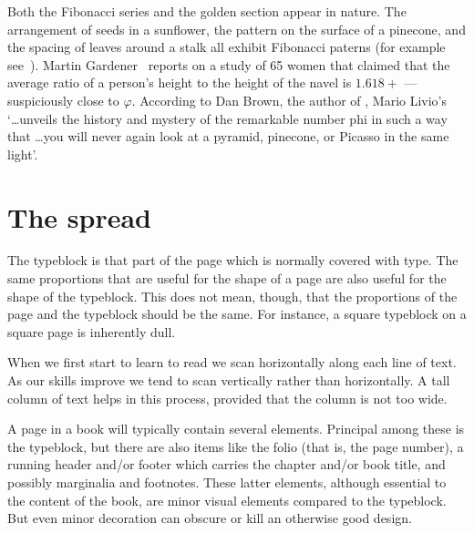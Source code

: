 \documentclass[10pt,letterpaper,extrafontsizes]{memoir}
\begin{document}
    Both the Fibonacci series and the golden section appear in nature.
The arrangement of seeds in a sunflower, the pattern on the surface of a 
pinecone, and the spacing of leaves around a stalk all exhibit Fibonacci
paterns (for example see~\autocite{CONWAY96}). Martin Gardener~\autocite{GARDNER66}
reports on a study of 65 women that claimed that the average ratio of a 
person's height to the height of the navel is $1.618+$ --- suspiciously 
close to $\varphi$. According to Dan Brown, the author of 
, Mario Livio's 
~\autocite{LIVIO02} 
`\ldots unveils the history and mystery of the remarkable
number phi in such a way that \ldots you will never again look at a pyramid,
pinecone, or Picasso in the same light'.



\section{The spread} \label{sec:spread}

    The typeblock is that part of the page which is normally 
covered with type. The same proportions that are useful for the shape of a 
page are also useful for the shape of the typeblock. This does not mean, 
though, that the proportions of the page and the typeblock should be the same. 
For instance, a square typeblock on a square page is inherently dull.

    When we first start to learn to read we scan horizontally along each line
of text. As our skills improve we tend to scan vertically rather than
horizontally. A tall column of text helps in this process, 
provided that the column is not too wide.

    A page in a book will typically contain several elements. Principal
among these is the typeblock, but there are also items like 
the folio (that is, the page number), 
a running header and/or footer 
which carries the chapter 
and/or book title, and possibly marginalia and 
footnotes. These latter
elements, although essential to the content of the book, are minor visual
elements compared to the typeblock. 
But even minor decoration can obscure
or kill an otherwise good design.
\end{document}
